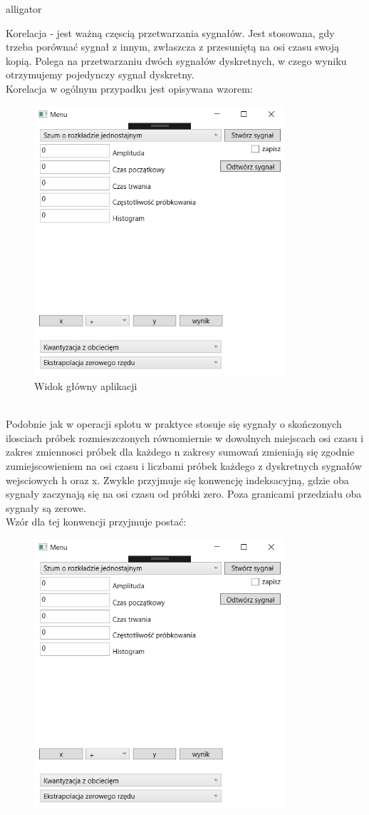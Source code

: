 \documentclass[12pt]{article}
\begin{document}
\begin{labeling}{alligator}
\item [Korelacja] - jest ważną częscią przetwarzania sygnałów. Jest stosowana, gdy trzeba porównać sygnał z innym, zwłaszcza z przesuniętą na osi czasu swoją kopią.
Polega na przetwarzaniu dwóch sygnałów dyskretnych, w czego wyniku otrzymujemy pojedynczy sygnał dyskretny.
\\Korelacja w ogólnym przypadku jest opisywana wzorem:
\begin{figure}[h!]
 \centering
 \includegraphics[width=9.3cm]{ui1.PNG}
 \vspace{-0.3cm}
 \caption{Widok główny aplikacji}
 \label{Widok_aplikacjis}
\end{figure}
\\Podobnie jak w operacji splotu w praktyce stosuje się sygnały o skończonych ilosciach próbek rozmieszczonych równomiernie w dowolnych miejscach osi czasu i zakres zmiennosci próbek dla każdego n zakresy sumowań zmieniają się zgodnie zumiejscowieniem na osi czasu i liczbami próbek każdego z dyskretnych sygnałów wejsciowych h oraz x. Zwykle przyjmuje się konwencję indeksacyjną, gdzie oba sygnały zaczynają się  na osi czasu od próbki zero. Poza granicami przedziału oba sygnały są zerowe. 
\\Wzór dla tej konwencji przyjmuje postać: 
\begin{figure}[h!]
 \centering
 \includegraphics[width=9.3cm]{ui1.PNG}

\end{figure}
\end{labeling}
\end{document}
